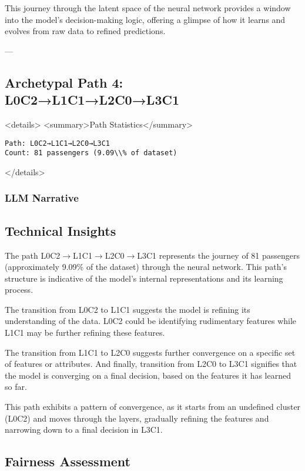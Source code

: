 This journey through the latent space of the neural network provides a window into the model's decision-making logic, offering a glimpse of how it learns and evolves from raw data to refined predictions.

---

\subsection*{Archetypal Path 4: L0C2→L1C1→L2C0→L3C1}

<details>
<summary>Path Statistics</summary>

\begin{verbatim}
Path: L0C2→L1C1→L2C0→L3C1
Count: 81 passengers (9.09\\% of dataset)
\end{verbatim}
</details>

\subsubsection*{LLM Narrative}

\subsection*{Technical Insights}

The path L0C2$\rightarrow$L1C1$\rightarrow$L2C0$\rightarrow$L3C1 represents the journey of 81 passengers (approximately 9.09\% of the dataset) through the neural network. This path's structure is indicative of the model's internal representations and its learning process. 

The transition from L0C2 to L1C1 suggests the model is refining its understanding of the data. L0C2 could be identifying rudimentary features while L1C1 may be further refining these features. 

The transition from L1C1 to L2C0 suggests further convergence on a specific set of features or attributes. And finally, transition from L2C0 to L3C1 signifies that the model is converging on a final decision, based on the features it has learned so far. 

This path exhibits a pattern of convergence, as it starts from an undefined cluster (L0C2) and moves through the layers, gradually refining the features and narrowing down to a final decision in L3C1.

\subsection*{Fairness Assessment}

